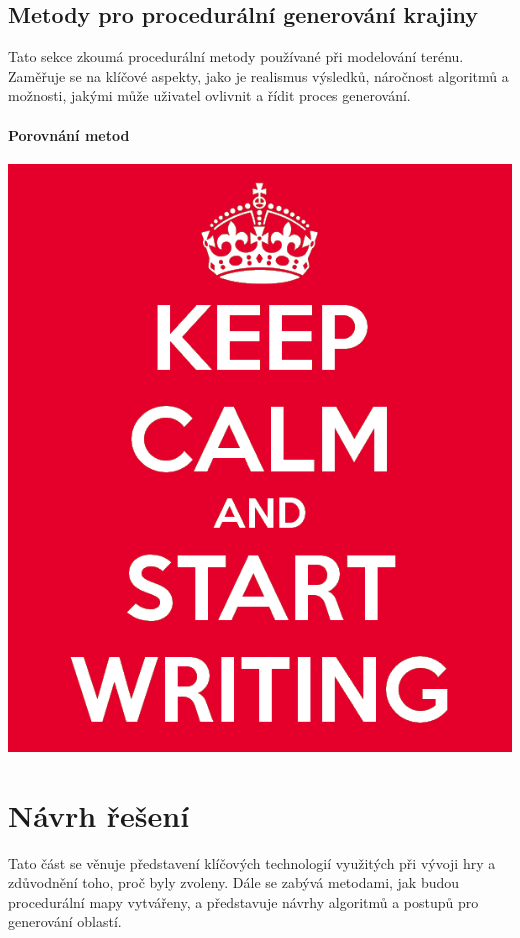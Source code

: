 \section{Metody pro procedurální generování krajiny}
Tato sekce zkoumá procedurální metody používané při modelování terénu. Zaměřuje se na klíčové aspekty, jako je realismus výsledků, náročnost algoritmů a možnosti, jakými může uživatel ovlivnit a řídit proces generování.~\cite{inproceedings}

\subsubsection{Porovnání metod}
\includegraphics[scale=0.3]{obrazky-figures/keep-calm.png}

\fi

\chapter{Návrh řešení}
\label{solution}
Tato část se věnuje představení klíčových technologií využitých při vývoji hry a zdůvodnění toho, proč byly zvoleny. Dále se zabývá metodami, jak budou procedurální mapy vytvářeny, a představuje návrhy algoritmů a postupů pro generování oblastí.

